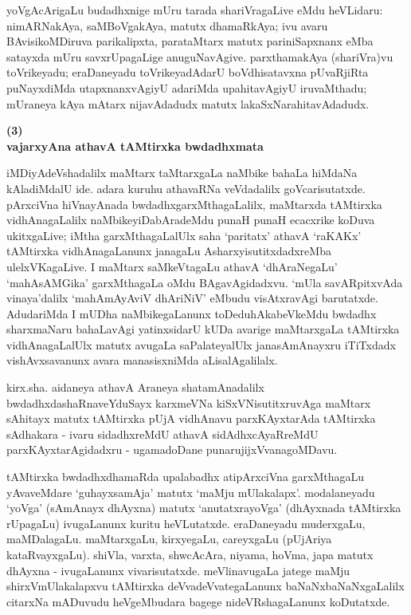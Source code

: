 yoVgAcArigaLu budadhxnige mUru tarada shariVragaLive eMdu heVLidaru: nimARNa\-kAya, saMBoVgakAya, matutx dhamaRkAya; ivu avaru BAvisi\-koMDi\-ruva parikalipxta, parataMtarx matutx pariniSapxnanx eMba satayxda mUru savxrUpagaLige anuguNa\-vAgive. parxthamakAya (shariVra)vu toVrikeyadu; eraDaneyadu toVrikeyadAdarU boVdhisatavxna pUvaRjiRta puNayxdiMda utapxnanxvAgiyU adariMda upahitavAgiyU iruvaMthadu; mUraneya kAya mAtarx nijavAdadudx matutx lakaSxNarahitavAdadudx.

\begin{center}
{\textbf{\Large (3)}}\\[5pt]
{\textbf{\Large vajarxyAna athavA tAMtirxka bwdadhxmata}}
\end{center}

iMDiyAdeVshadalilx maMtarx taMtarxgaLa naMbike bahaLa hiMdaNa kAladiMdalU ide. adara kuruhu athavaRNa veVdadalilx goVcarisutatxde. pArxciVna hiVnayAnada bwdadhxgarxMthagaLalilx, maMtarxda tAMtirxka vidhAnagaLalilx naMbikeyiDabAradeMdu punaH punaH ecacxrike koDuva ukitxgaLive; iMtha garxMthagaLalUlx saha `paritatx' athavA `raKAKx' tAMtirxka vidhAnagaLanunx janagaLu AsharxyisutitxdadxreMba ulelxVKagaLive. I maMtarx saMkeVtagaLu athavA `dhAraNegaLu' `mahAsAMGika' garxMthagaLa oMdu BAgavAgidadxvu. `mUla savARpitxvAda vinaya'dalilx `mahAmAyAviV dhAriNiV' eMbudu visAtxravAgi barutatxde. AdudariMda I mUDha naMbikegaLanunx toDeduhAkabeVkeMdu bwdadhx sharxmaNaru bahaLavAgi yatinxsidarU kUDa avarige maMtarxgaLa tAMtirxka vidhAnagaLalUlx matutx avugaLa saPalateyalUlx janasAmAnayxru iTiTxdadx vishAvxsavanunx avara manasisxniMda aLisalAgalilalx.

kirx.sha. aidaneya athavA Araneya shatamAnadalilx bwdadhxdashaRnaveYduSayx karxmeVNa kiSxVNisutitxruvAga maMtarx sAhitayx matutx tAMtirxka pUjA vidhAnavu parxKAyxtarAda tAMtirxka sAdhakara - ivaru sidadhxreMdU athavA sidAdhxcAyaRreMdU parxKAyxtarAgidadxru - ugamadoDane punarujijxVvanagoMDavu.

tAMtirxka bwdadhxdhamaRda upalabadhx atipArxciVna garxMthagaLu yAvaveMdare `guhayxsamAja' matutx `maMju mUlakalapx'. modalaneyadu `yoVga' (sAmAnayx dhAyxna) matutx `anutatxrayoVga' (dhAyxnada tAMtirxka rUpagaLu) ivugaLanunx kuritu heVLutatxde. eraDaneyadu muderxgaLu, maMDalagaLu. maMtarxgaLu, kirxyegaLu, careyxgaLu (pUjAriya kataRvayxgaLu). shiVla, varxta, shwcAcAra, niyama, hoVma, japa matutx dhAyxna - ivugaLanunx vivarisutatxde. meVlinavugaLa jatege maMju shirxVmUlakalapxvu tAMtirxka deVvadeVvategaLanunx baNaNxbaNaNxgaLalilx citarxNa mADuvudu heVgeMbudara bagege nideVRshagaLanunx koDutatxde.

